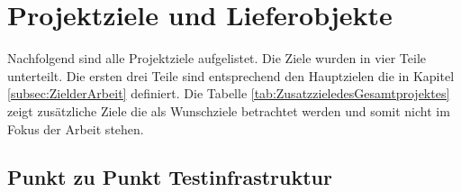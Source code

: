 \clearpage
\section{Projektziele und Lieferobjekte}\label{sec:ProjektzieleundLieferobjekte}

Nachfolgend sind alle Projektziele aufgelistet. Die Ziele wurden in vier Teile unterteilt. Die ersten drei Teile sind entsprechend den Hauptzielen die in Kapitel \ref{subsec:ZielderArbeit} definiert. Die Tabelle \ref{tab:ZusatzzieledesGesamtprojektes} zeigt zusätzliche Ziele die als Wunschziele betrachtet werden und somit nicht im Fokus der Arbeit stehen.

\subsection{Punkt zu Punkt Testinfrastruktur}\label{subsec:PunktzuPunktTestinfrastruktur}

